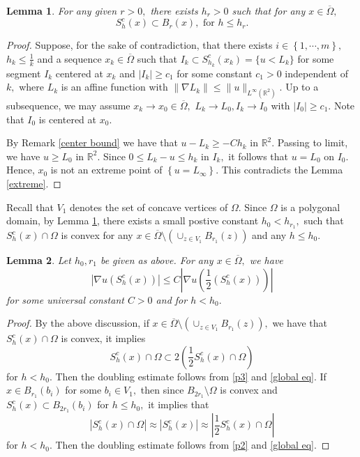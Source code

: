 \documentclass[11pt]{amsart}
\theoremstyle{plain}
\newtheorem{lemma}{Lemma}[section]
\newcommand{\0}{\textbf{0}}
\numberwithin{equation}{section}
\numberwithin{equation}{section}
\numberwithin{figure}{section}
\begin{document}
	\begin{lemma}\label{localisation1} For any given $r>0,$
		there exists $h_r>0$ such that for any $x\in \overline{\Omega},$  		
		$$S^c_h(x)\subset B_{r}(x),\text{ for }h\leq h_r.$$
	\end{lemma}
	\begin{proof}
		Suppose, for the sake of contradiction, that there exists $i\in\left\{1,\cdots,m\right\},$ $h_k\leq \frac{1}{k}$ and a sequence $x_k\in\overline{\Omega}$ such that
		$I_k\subset S^c_{h_k}(x_k)=\{u<L_k\}$ for some segment $I_k$ centered at $x_k$ and $|I_k|\geq c_1$ for some constant $c_1>0$ independent of $k,$ where $L_k$ is an affine function
		with $\|\nabla L_k\|\leq \|u\|_{L^\infty(\mathbb{R}^2)}.$ Up to a subsequence, we may assume 
		$x_k\rightarrow x_0\in \overline{\Omega},$ $L_k\rightarrow L_0, I_k\rightarrow I_0$ with $|I_0|\geq c_1.$ Note that $I_0$ is centered at $x_0.$
		
		By Remark \ref{center bound} we have that $u-L_k\geq -Ch_k$ in $\mathbb{R}^2.$ Passing to limit, we have $u\geq L_0$ in $\mathbb{R}^2.$
		Since $0\leq L_k-u\leq h_k$ in $I_k,$  it follows that $u=L_0$ on $I_0.$  Hence, $x_0$ is not an extreme point of $\left\{u=L_\infty\right\}.$ This contradicts the Lemma \ref{extreme}.
	\end{proof}
	
	
	Recall that $V_1$ denotes the set of concave vertices of $\Omega.$
	Since $\Omega$ is a polygonal domain, by Lemma \ref{localisation1}, there exists a small postive constant $h_0<h_{r_1},$ such that
	$S_h^c(x)\cap \Omega$ is convex for any $x\in \overline{\Omega}\setminus\left(\cup_{z\in V_1}B_{r_1}(z)\right)$ and any $h\leq h_0.$
	
	
	
	
	\begin{lemma}\label{dlem1}
		Let $h_0,r_1$ be given as above. For any $x\in \overline{\Omega},$ we have 
		$$|\nabla u(S^c_h(x))|\leq C|\nabla u(\frac{1}{2}(S^c_h(x)))|$$
		for some universal constant $C>0$ and for $h<h_0.$
	\end{lemma}
	\begin{proof}
		By the above discussion, if $x\in \overline{\Omega}\setminus\left(\cup_{z\in V_1}B_{r_1}(z)\right),$ we have that $S_h^c(x)\cap \Omega$ is convex, it implies
		\begin{equation}\label{p3}
			S^c_h(x)\cap \Omega\subset 2(\frac{1}{2}S^c_h(x)\cap \Omega)
		\end{equation}
		for $h<h_0.$
		Then the doubling estimate follows from \eqref{p3} and \eqref{global eq}.
		If $x\in B_{r_1}(b_i)$ for some $b_i\in V_1,$ then since $B_{2r_1}\setminus\Omega$ is convex and $S_h^c(x)\subset  B_{2r_1}(b_i)$ for $h\leq h_0,$ it implies that 
		\begin{equation}\label{p2}
			|S^c_h(x)\cap \Omega|\approx |S^c_h(x)|\approx|\frac{1}{2}S^c_h(x)\cap \Omega|
		\end{equation}
		for $h<h_0.$ 
		Then the doubling estimate follows from \eqref{p2} and \eqref{global eq}.
	\end{proof}
	
\end{document}
